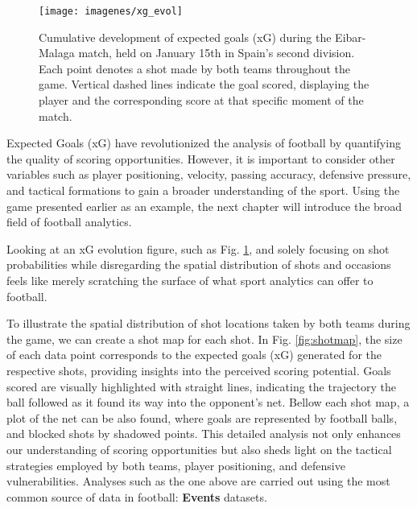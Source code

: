 \documentclass[
  twoside,nohyper]{book}
\begin{document}
\begin{figure}[H]

{\centering \texttt{[image: imagenes/xg\_evol]} 

}

\caption{Cumulative development of expected goals (xG) during the Eibar-Malaga match, held on January 15th in Spain’s second division. Each point denotes a shot made by both teams throughout the game. Vertical dashed lines indicate the goal scored, displaying the player and the corresponding score at that specific moment of the match.}\label{fig:xg}
\end{figure}

Expected Goals (xG) have revolutionized the analysis of football by quantifying the quality of scoring opportunities. However, it is important to consider other variables such as player positioning, velocity, passing accuracy, defensive pressure, and tactical formations to gain a broader understanding of the sport. Using the game presented earlier as an example, the next chapter will introduce the broad field of football analytics.

Looking at an xG evolution figure, such as Fig. \ref{fig:xg}, and solely focusing on shot probabilities while disregarding the spatial distribution of shots and occasions feels like merely scratching the surface of what sport analytics can offer to football.

To illustrate the spatial distribution of shot locations taken by both teams during the game, we can create a shot map for each shot. In Fig. \ref{fig:shotmap}, the size of each data point corresponds to the expected goals (xG) generated for the respective shots, providing insights into the perceived scoring potential. Goals scored are visually highlighted with straight lines, indicating the trajectory the ball followed as it found its way into the opponent's net. Bellow each shot map, a plot of the net can be also found, where goals are represented by football balls, and blocked shots by shadowed points. This detailed analysis not only enhances our understanding of scoring opportunities but also sheds light on the tactical strategies employed by both teams, player positioning, and defensive vulnerabilities. Analyses such as the one above are carried out using the most common
source of data in football: \textbf{Events} datasets.
\end{document}
